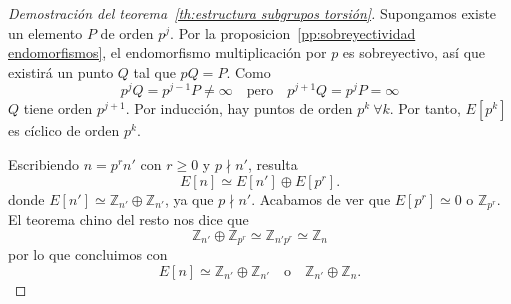 \begin{proof}[Demostración del teorema~\ref{th:estructura subgrupos torsión}]
Supongamos existe un elemento $P$ de orden $p^j$. Por la proposicion~\ref{pp:sobreyectividad endomorfismos}, el endomorfismo multiplicación por $p$ es sobreyectivo, así que existirá un punto $Q$ tal que $p Q = P$. Como
$$
	p^j Q = p^{j-1} P \neq \infty \quad \textrm{pero} \quad p^{j+1} Q = p^j P = \infty
$$
$Q$ tiene orden $p^{j+1}$. Por inducción, hay puntos de orden $p^k \ \forall k$. Por tanto, $E[p^k]$ es cíclico de orden $p^k$.

Escribiendo $n = p^r n'$ con $r \geq 0$ y $p \nmid n'$, resulta
$$
	E[n] \simeq E[n'] \oplus E[p^r].
$$
donde $E[n'] \simeq \mathbb{Z}_{n'} \oplus \mathbb{Z}_{n'}$, ya que $p \nmid n'$. Acabamos de ver que $E[p^r] \simeq 0$ o $\mathbb{Z}_{p^r}$. El teorema chino del resto nos dice que
$$
	\mathbb{Z}_{n'} \oplus \mathbb{Z}_{p^r} \simeq \mathbb{Z}_{n' p^r} \simeq \mathbb{Z}_{n}
$$
por lo que concluimos con
$$
	E[n] \simeq \mathbb{Z}_{n'} \oplus \mathbb{Z}_{n'} \quad \textrm{o} \quad  \mathbb{Z}_{n'} \oplus \mathbb{Z}_{n}.
$$
\end{proof}

